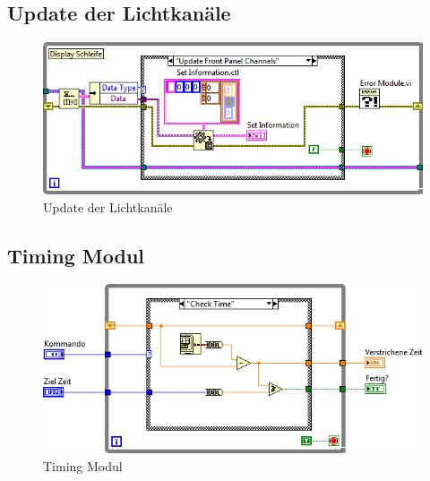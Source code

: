 	

	\subsection{Update der Lichtkanäle}
	\begin{figure}[h!]
	\centering
		\includegraphics[width=\textwidth]{Pics/front-kanale.png}
	\caption{Update der Lichtkanäle}
	\label{fig:a7}
	\end{figure}
	
	\subsection{Timing Modul}
	\begin{figure}[h!]
	\centering
		\includegraphics[width=\textwidth]{Pics/zeit.png}
	\caption{Timing Modul}
	\label{fig:a8}
	\end{figure}
	\newpage	
	
